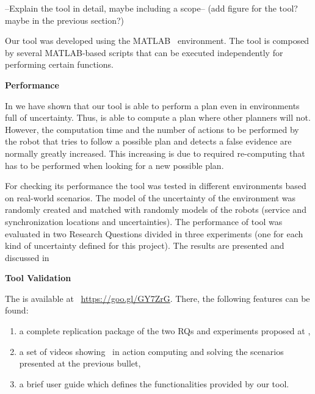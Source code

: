 --Explain the tool in detail, maybe including a scope-- (add figure for the tool? maybe in the previous section?)

Our tool was developed using the MATLAB~\cite{matlab} environment.
The tool is composed by several MATLAB-based scripts that can be executed independently for performing certain functions.


\textbf{Performance}

In  we have shown that our tool is able to perform a plan even in environments full of uncertainty.
Thus, \toolName is able to compute a plan where other planners will not.
However, the computation time and the number of actions to be performed by the robot that tries to follow a possible plan and detects a false evidence are normally greatly increased.
This increasing is due to required re-computing that has to be performed when looking for a new possible plan.

For checking its performance the tool was tested in different environments based on real-world scenarios.
The model of the uncertainty of the environment was randomly created and matched with randomly models of the robots (service and synchronization locations and uncertainties).
The performance of tool was evaluated in two Research Questions divided in three experiments (one for each kind of uncertainty defined for this project).
The results are presented and discussed in 


\textbf{Tool Validation}

The \toolName is available at ~\url{https://goo.gl/GY7ZrG}.
There, the following features can be found:
\begin{enumerate}
\item a complete replication package of the two RQs and experiments proposed at ,
\item  a set of videos showing \toolName\ in action computing and solving the scenarios presented at the previous bullet,
\item a brief user guide which defines the functionalities provided by our tool.
\end{enumerate}
